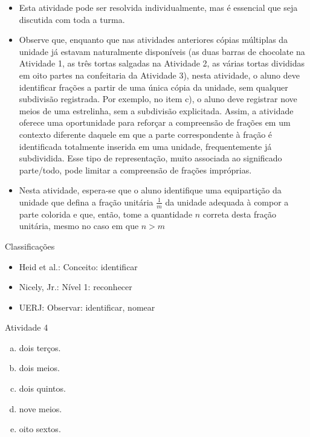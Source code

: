 \documentclass[oneside]{book}
\begin{document}
\begin{multicols}{2}
  \begin{itemize} %
    \item       Esta atividade pode ser resolvida individualmente, mas é essencial que seja discutida com toda a turma.
    \item       Observe que, enquanto que nas atividades anteriores cópias múltiplas da unidade já estavam naturalmente disponíveis (as duas barras de chocolate na Atividade 1, as três tortas salgadas na Atividade 2, as várias tortas divididas em oito partes na confeitaria da Atividade 3), nesta atividade, o aluno deve identificar frações a partir de uma única cópia da unidade, sem qualquer subdivisão registrada. Por exemplo, no item c), o aluno deve registrar nove meios de uma estrelinha, sem a subdivisão explicitada. Assim, a atividade oferece uma oportunidade para reforçar a compreensão de frações em um contexto diferente daquele em que a parte correspondente à fração é identificada totalmente inserida em uma unidade, frequentemente já subdividida. Esse tipo de representação, muito associada ao significado parte/todo, pode limitar a compreensão de frações impróprias.
    \item       Nesta atividade, espera-se que o aluno identifique uma equipartição da unidade que defina a fração unitária       $\frac{1}{m}$       da unidade adequada à compor a parte colorida e que, então, tome a quantidade       $n$       correta desta fração unitária, mesmo no caso em que       $n > m$
\end{itemize} %


  Classificações
\begin{itemize} %
    \item       Heid et al.: Conceito: identificar
    \item       Nicely, Jr.: Nível 1: reconhecer
    \item       UERJ: Observar: identificar, nomear
\end{itemize} %

\begin{resposta*}{Atividade 4}
  \begin{enumerate}[a)]
   \item dois terços.
   \item dois meios.
   \item dois quintos.
   \item nove meios.
   \item oito sextos.
\end{enumerate}
  \end{resposta*}




\end{multicols}
\end{document}
